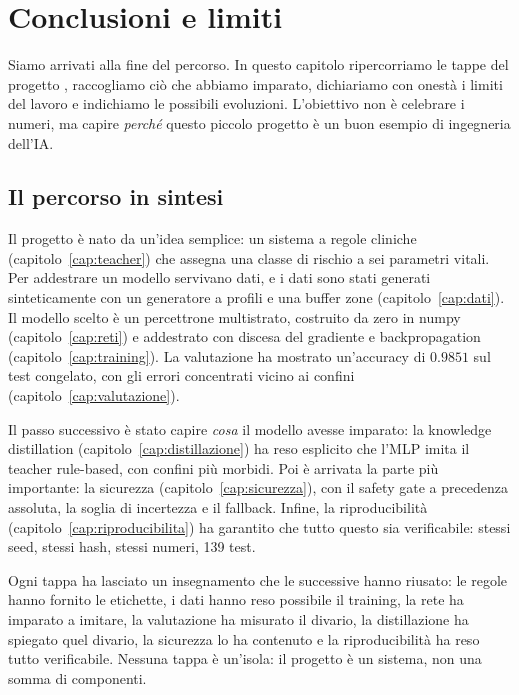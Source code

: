 
\chapter{Conclusioni e limiti}\label{cap:conclusioni}

Siamo arrivati alla fine del percorso. In questo capitolo ripercorriamo le
tappe del progetto \progetto{}, raccogliamo ciò che abbiamo imparato,
dichiariamo con onestà i limiti del lavoro e indichiamo le possibili
evoluzioni. L'obiettivo non è celebrare i numeri, ma capire \emph{perché}
questo piccolo progetto è un buon esempio di ingegneria dell'IA.

\section{Il percorso in sintesi}\label{sec:percorso-sintesi}

Il progetto è nato da un'idea semplice: un sistema a regole cliniche
(capitolo~\ref{cap:teacher}) che assegna una classe di rischio a sei
parametri vitali. Per addestrare un modello servivano dati, e i dati sono
stati generati sinteticamente con un generatore a profili e una buffer
zone (capitolo~\ref{cap:dati}). Il modello scelto è un percettrone
multistrato, costruito da zero in numpy (capitolo~\ref{cap:reti}) e
addestrato con discesa del gradiente e backpropagation
(capitolo~\ref{cap:training}). La valutazione ha mostrato un'accuracy di
$0.9851$ sul test congelato, con gli errori concentrati vicino ai confini
(capitolo~\ref{cap:valutazione}).

Il passo successivo è stato capire \emph{cosa} il modello avesse imparato:
la knowledge distillation (capitolo~\ref{cap:distillazione}) ha reso
esplicito che l'MLP imita il teacher rule-based, con confini più morbidi.
Poi è arrivata la parte più importante: la sicurezza
(capitolo~\ref{cap:sicurezza}), con il safety gate a precedenza assoluta,
la soglia di incertezza e il fallback. Infine, la riproducibilità
(capitolo~\ref{cap:riproducibilita}) ha garantito che tutto questo sia
verificabile: stessi seed, stessi hash, stessi numeri, 139 test.

Ogni tappa ha lasciato un insegnamento che le successive hanno riusato: le
regole hanno fornito le etichette, i dati hanno reso possibile il training,
la rete ha imparato a imitare, la valutazione ha misurato il divario, la
distillazione ha spiegato quel divario, la sicurezza lo ha contenuto e la
riproducibilità ha reso tutto verificabile. Nessuna tappa è un'isola: il
progetto è un sistema, non una somma di componenti.

